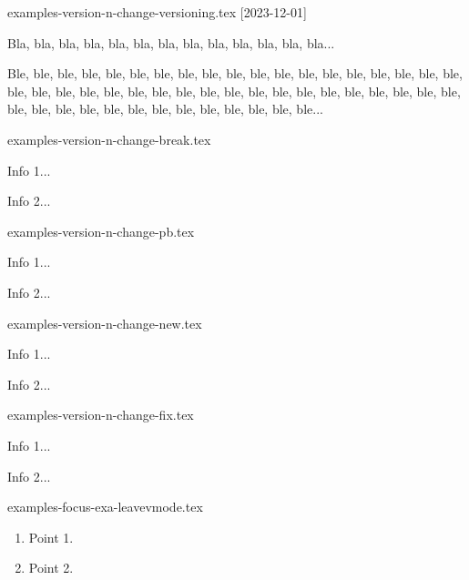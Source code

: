 \begin{filecontents*}[overwrite]{examples-version-n-change-versioning.tex}
[2023-12-01]

Bla, bla, bla, bla, bla, bla, bla, bla, bla, bla, bla, bla, bla...

\bigskip %


Ble, ble, ble, ble, ble, ble, ble, ble, ble, ble, ble, ble, ble,
ble, ble, ble, ble, ble, ble, ble, ble, ble, ble, ble, ble, ble,
ble, ble, ble, ble, ble, ble, ble, ble, ble, ble, ble, ble, ble,
ble, ble, ble, ble, ble, ble, ble, ble, ble, ble, ble, ble...
\end{filecontents*}


\begin{filecontents*}[overwrite]{examples-version-n-change-break.tex}
\begin{tdocbreak}
    \item Info 1...
    \item Info 2...
\end{tdocbreak}
\end{filecontents*}


\begin{filecontents*}[overwrite]{examples-version-n-change-pb.tex}
\begin{tdocprob}
    \item Info 1...
    \item Info 2...
\end{tdocprob}
\end{filecontents*}


\begin{filecontents*}[overwrite]{examples-version-n-change-new.tex}
\begin{tdocnew}
    \item Info 1...
    \item Info 2...
\end{tdocnew}
\end{filecontents*}


\begin{filecontents*}[overwrite]{examples-version-n-change-fix.tex}
\begin{tdocfix}
    \item Info 1...
    \item Info 2...
\end{tdocfix}
\end{filecontents*}


\begin{filecontents*}[overwrite]{examples-focus-exa-leavevmode.tex}
\begin{tdocexa}
    \leavevmode
    \begin{enumerate}
        \item Point 1.

        \item Point 2.
    \end{enumerate}
\end{tdocexa}
\end{filecontents*}


